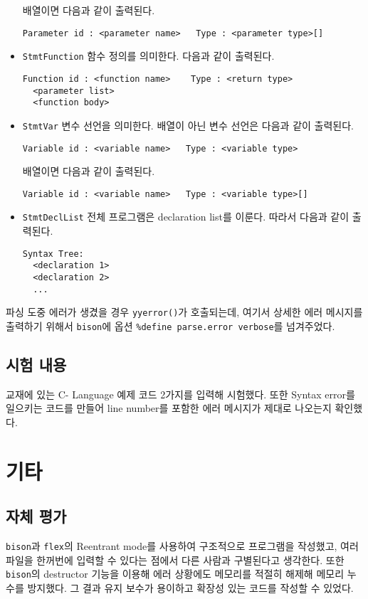\documentclass[a4paper, 10pt]{oblivoir}
\begin{document}
\begin{itemize}
배열이면 다음과 같이 출력된다.
\begin{lstlisting}[frame=single]
Parameter id : <parameter name>   Type : <parameter type>[]
\end{lstlisting}

\item \texttt{StmtFunction} \newline
함수 정의를 의미한다. 다음과 같이 출력된다.
\begin{lstlisting}[frame=single]
Function id : <function name>    Type : <return type>
  <parameter list>
  <function body>
\end{lstlisting}

\item \texttt{StmtVar} \newline
변수 선언을 의미한다. 배열이 아닌 변수 선언은 다음과 같이 출력된다.
\begin{lstlisting}[frame=single]
Variable id : <variable name>   Type : <variable type>
\end{lstlisting}

배열이면 다음과 같이 출력된다.
\begin{lstlisting}[frame=single]
Variable id : <variable name>   Type : <variable type>[]
\end{lstlisting}

\item \texttt{StmtDeclList} \newline
전체 프로그램은 declaration list를 이룬다. 따라서 다음과 같이 출력된다.
\begin{lstlisting}[frame=single]
Syntax Tree:
  <declaration 1>
  <declaration 2>
  ...
\end{lstlisting}

\end{itemize}

파싱 도중 에러가 생겼을 경우 \texttt{yyerror()}가 호출되는데, 여기서 상세한 에러 메시지를 출력하기 위해서 \texttt{bison}에 옵션 \texttt{\%define parse.error verbose}를 넘겨주었다.

\subsection{시험 내용}
교재에 있는 C- Language 예제 코드 2가지를 입력해 시험했다. 또한 Syntax error를 일으키는 코드를 만들어 line number를 포함한 에러 메시지가 제대로 나오는지 확인했다. 

\section{기타}
\subsection{자체 평가}
\texttt{bison}과 \texttt{flex}의 Reentrant mode를 사용하여 구조적으로 프로그램을 작성했고, 여러 파일을 한꺼번에 입력할 수 있다는 점에서 다른 사람과 구별된다고 생각한다. 또한 \texttt{bison}의 destructor 기능을 이용해 에러 상황에도 메모리를 적절히 해제해 메모리 누수를 방지했다. 그 결과 유지 보수가 용이하고 확장성 있는 코드를 작성할 수 있었다.
\end{document}
